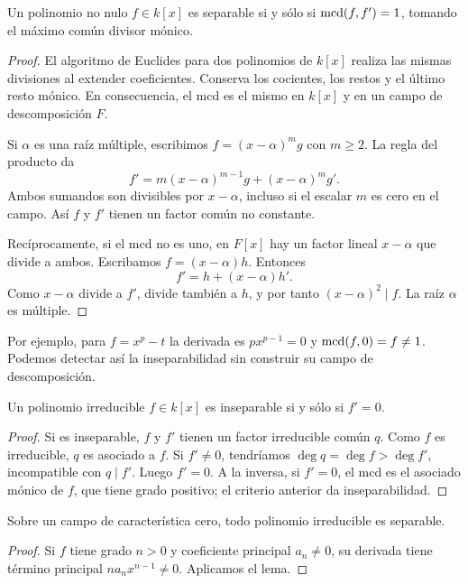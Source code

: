 \begin{lema}\label{lema:C25-derivada}
Un polinomio no nulo $f\in k[x]$ es separable si y sólo si $\operatorname{mcd}(f,f')=1$, tomando el máximo común divisor mónico.
\end{lema}
\begin{proof}
El algoritmo de Euclides para dos polinomios de $k[x]$ realiza las mismas divisiones al extender coeficientes. Conserva los cocientes, los restos y el último resto mónico. En consecuencia, el mcd es el mismo en $k[x]$ y en un campo de descomposición $F$.

Si $\alpha$ es una raíz múltiple, escribimos $f=(x-\alpha)^m g$ con $m\geq2$. La regla del producto da
\[
f'=m(x-\alpha)^{m-1}g+(x-\alpha)^m g'.
\]
Ambos sumandos son divisibles por $x-\alpha$, incluso si el escalar $m$ es cero en el campo. Así $f$ y $f'$ tienen un factor común no constante.

Recíprocamente, si el mcd no es uno, en $F[x]$ hay un factor lineal $x-\alpha$ que divide a ambos. Escribamos $f=(x-\alpha)h$. Entonces
\[
f'=h+(x-\alpha)h'.
\]
Como $x-\alpha$ divide a $f'$, divide también a $h$, y por tanto $(x-\alpha)^2\mid f$. La raíz $\alpha$ es múltiple.
\end{proof}
Por ejemplo, para $f=x^p-t$ la derivada es $px^{p-1}=0$ y $\operatorname{mcd}(f,0)=f\ne1$. Podemos detectar así la inseparabilidad sin construir su campo de descomposición.

\begin{lema}\label{lema:C25-irred-derivada}
Un polinomio irreducible $f\in k[x]$ es inseparable si y sólo si $f'=0$.
\end{lema}
\begin{proof}
Si es inseparable, $f$ y $f'$ tienen un factor irreducible común $q$. Como $f$ es irreducible, $q$ es asociado a $f$. Si $f'\ne0$, tendríamos $\deg q=\deg f>\deg f'$, incompatible con $q\mid f'$. Luego $f'=0$. A la inversa, si $f'=0$, el mcd es el asociado mónico de $f$, que tiene grado positivo; el criterio anterior da inseparabilidad.
\end{proof}

\begin{coro}\label{coro:C25-caracteristica-cero}
Sobre un campo de característica cero, todo polinomio irreducible es separable.
\end{coro}
\begin{proof}
Si $f$ tiene grado $n>0$ y coeficiente principal $a_n\ne0$, su derivada tiene término principal $na_nx^{n-1}\ne0$. Aplicamos el lema.
\end{proof}

